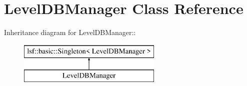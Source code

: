 \hypertarget{classLevelDBManager}{
\section{LevelDBManager Class Reference}
\label{classLevelDBManager}
}
Inheritance diagram for LevelDBManager::\begin{figure}[H]
\begin{center}
\leavevmode
\includegraphics[height=2cm]{classLevelDBManager}
\end{center}
\end{figure}
